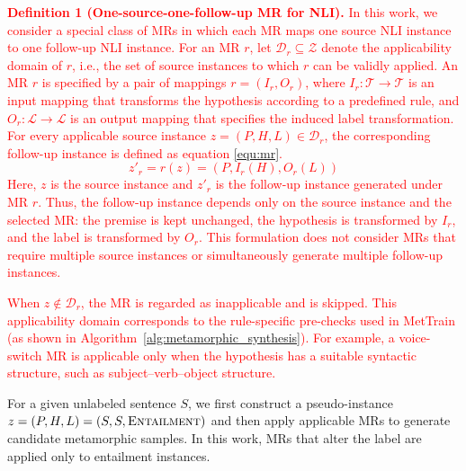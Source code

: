 \documentclass[lettersize,journal]{IEEEtran}
\newcommand{\red}[1]{\textcolor{red}{#1}}
\begin{document}
\red{\noindent\textbf{Definition 1 (One-source-one-follow-up MR for NLI).}
In this work, we consider a special class of MRs in which each MR maps one
source NLI instance to one follow-up NLI instance. For an MR $r$,
let $\mathcal{D}_r\subseteq\mathcal{Z}$ denote the applicability domain of
$r$, i.e., the set of source instances to which $r$ can be validly applied.
An MR $r$ is specified by a pair of mappings $r=(I_r,O_r)$, where
$I_r:\mathcal{T}\rightarrow\mathcal{T}$ is an input mapping that transforms
the hypothesis according to a predefined rule, and
$O_r:\mathcal{L}\rightarrow\mathcal{L}$ is an output mapping that specifies
the induced label transformation. For every applicable source instance
$z=(P,H,L)\in\mathcal{D}_r$, the corresponding follow-up instance is defined as equation \ref{equ:mr}.
\begin{equation}
	\label{equ:mr}
	z'_r = r(z) = (P, I_r(H), O_r(L))
\end{equation}
Here, $z$ is the source instance and $z'_r$ is the follow-up instance generated
under MR $r$. Thus, the follow-up instance depends only on the source instance
and the selected MR: the premise is kept unchanged, the hypothesis is
transformed by $I_r$, and the label is transformed by $O_r$. This formulation
does not consider MRs that require multiple source instances or simultaneously
generate multiple follow-up instances.}

\red{When $z\notin\mathcal{D}_r$, the MR is regarded as inapplicable and is skipped.
This applicability domain corresponds to the rule-specific pre-checks used in
MetTrain (as shown in Algorithm~\ref{alg:metamorphic_synthesis}). For example, a voice-switch MR is applicable only when the hypothesis
has a suitable syntactic structure, such as subject--verb--object structure.}

For a given unlabeled sentence $S$, we first construct a pseudo-instance
$z=(P,H,L)=(S,S,\textsc{Entailment})$ and then apply applicable MRs to generate
candidate metamorphic samples. In this work, MRs that alter the label are
applied only to entailment instances.

\end{document}

